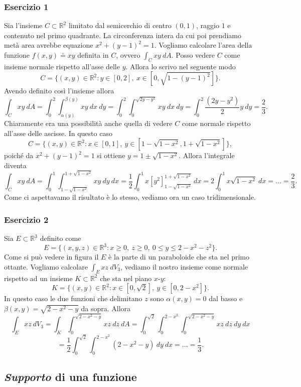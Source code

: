 \documentclass[10pt]{article}
\theoremstyle{plain}
\theoremstyle{definition}
\begin{document}
\subsubsection{Esercizio 1}
Sia l'insieme $C\subset \mathbb{R}^2$ limitato dal semicerchio di centro $(0,1)$, raggio $1$ e contenuto nel primo quadrante. La circonferenza intera da cui poi prendiamo metà area avrebbe equazione $x^2+(y-1)^2=1$.
Vogliamo calcolare l'area della funzione $f(x,y)\doteq xy$ definita in $C$, ovvero 
$\int_C xy\ dA$. Posso vedere $C$ come insieme normale rispetto all'asse delle $y$.
Allora lo scrivo nel seguente modo
$$C=\{ (x,y)\in \mathbb{R}^2:y\in [0,2],\ x \in [0,\sqrt{1-(y-1)^2}] \}.$$
Avendo definito così l'insieme allora 
$$\int_C xy\ dA = \int_0^2 \int_{\alpha(y)}^{\beta(y)} xy\ dx\ dy=\int_0^2 \int_0^{\sqrt{2y-y^2}} xy\ dx\ dy = \int_0^2 \frac{(2y-y^2)}{2}y\ dy = \frac{2}{3}.$$
Chiaramente era una possibilità anche quella di vedere $C$ come normale rispetto all'asse delle ascisse. In questo caso
$$C=\{ (x,y)\in \mathbb{R}^2:x\in [0,1],\ y \in [1-\sqrt{1-x^2},1+\sqrt{1-x^2}] \},$$
poiché da $x^2+(y-1)^2=1$ si ottiene $y=1 \pm \sqrt{1-x^2}$.
Allora l'integrale diventa 
$$\int_C xy\ dA = \int_0^1 \int_{1-\sqrt{1-x^2}}^{1+\sqrt{1-x^2}} xy\ dy\ dx=\frac{1}{2} \int_0^1  x[y^2]_{1-\sqrt{1-x^2}}^{1+\sqrt{1-x^2}}\ dx = 2 \int_0^1  x\sqrt{1-x^2}\ dx =...=\frac{2}{3}.$$
Come ci aspettavamo il risultato è lo stesso, vediamo ora un caso tridimensionale.

\subsubsection{Esercizio 2}
Sia $E\subset \mathbb{R}^3$ definito come
$$E=\{ (x,y,z)\in \mathbb{R}^3:x\geq 0,\ z\geq 0,\  0\leq y\leq 2-x^2-z^2 \}.$$
Come si può vedere in figura il $E$ è la parte di un paraboloide che sta nel primo ottante. Vogliamo calcolare $\int_E xz\ dV_3$, vediamo il nostro insieme come normale rispetto ad un insieme $K\subset \mathbb{R}^2$ che sta nel piano $x$-$y$:
$$K=\{ (x,y)\in \mathbb{R}^2:x \in [0,\sqrt{2}],\ y\in [0,2-x^2] \}.$$
In questo caso le due funzioni che delimitano $z$ sono $\alpha (x,y)=0$ dal basso e $\beta (x,y)=\sqrt{2-x^2-y}$ da sopra.
Allora 
$$\int_E xz\ dV_3=\int_K \int_0^{\sqrt{2-x^2-y}} xz\ dz\ dA=\int_0^{\sqrt{2}} \int_0^{2-x^2} \int_0^{\sqrt{2-x^2-y}} xz\ dz\ dy\ dx$$
$$ = \frac{1}{2}\int_0^{\sqrt{2}} \int_0^{2-x^2} (2-x^2-y)\ dy\ dx = ... = \frac{1}{3}.$$

\subsection{\textit{Supporto} di una funzione}
\end{document}
